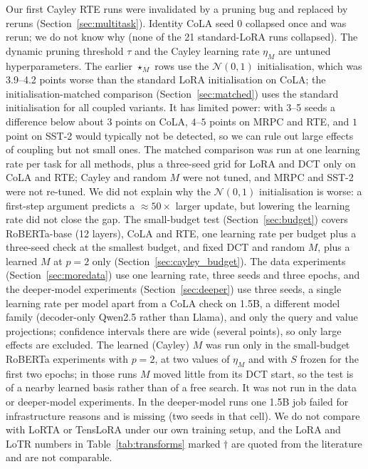 \documentclass{article}
\theoremstyle{plain}
\begin{document}
Our first Cayley RTE runs were invalidated by a pruning bug and replaced by reruns (Section~\ref{sec:multitask}).
Identity CoLA seed 0 collapsed once and was rerun; we do not know why (none of the 21 standard-LoRA runs collapsed).
The dynamic pruning threshold $\tau$ and the Cayley learning rate $\eta_M$ are untuned hyperparameters.
The earlier $\star_M$ rows use the $\mathcal{N}(0,1)$ initialisation, which was 3.9--4.2 points worse than the standard LoRA initialisation on CoLA; the
initialisation-matched comparison (Section~\ref{sec:matched}) uses the standard initialisation for all coupled variants.
It has limited power: with 3--5 seeds a difference below about $3$ points on CoLA, $4$--$5$ points on MRPC and RTE, and $1$ point on SST-2 would typically not be detected, so we can rule out large effects of coupling but not small ones.
The matched comparison was run at one learning rate per task for all methods, plus a three-seed grid for LoRA and DCT only on CoLA and RTE; Cayley and random $M$ were not tuned, and MRPC and SST-2 were not re-tuned.
We did not explain why the $\mathcal{N}(0,1)$ initialisation is worse: a first-step argument predicts a $\approx50\times$ larger update, but lowering the learning rate did not close the gap.
The small-budget test (Section~\ref{sec:budget}) covers RoBERTa-base (12 layers), CoLA and RTE, one learning rate per budget plus a three-seed check at the smallest budget, and fixed DCT and random $M$, plus a learned $M$ at $p=2$ only (Section~\ref{sec:cayley_budget}).
The data experiments (Section~\ref{sec:moredata}) use one learning rate, three seeds and three epochs, and the deeper-model experiments (Section~\ref{sec:deeper}) use three seeds, a single learning rate per model apart from a CoLA check on 1.5B, a different model family (decoder-only Qwen2.5 rather than Llama), and only the query and value projections; confidence intervals there are wide (several points), so only large effects are excluded.
The learned (Cayley) $M$ was run only in the small-budget RoBERTa experiments with $p=2$, at two values of $\eta_M$ and with $S$ frozen for the first two epochs; in those runs $M$ moved little from its DCT start, so the test is of a nearby learned basis rather than of a free search.
It was not run in the data or deeper-model experiments.
In the deeper-model runs one 1.5B job failed for infrastructure reasons and is missing (two seeds in that cell).
We do not compare with LoRTA or TensLoRA under our own training setup,
and the LoRA and LoTR numbers in Table~\ref{tab:transforms} marked $\dagger$ are quoted from the literature and are not comparable.
\end{document}
